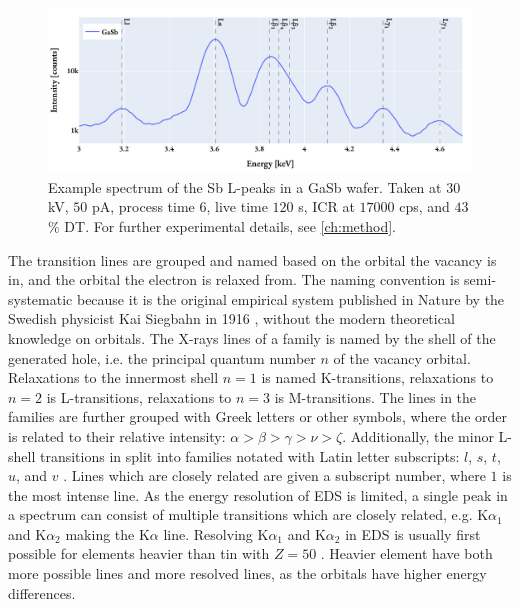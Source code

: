 \begin{figure}[p]
    \centering
    \includegraphics[width=0.99\linewidth]{figures/Sb_L-peaks_30kV_50pA.pdf}
    \caption{
        Example spectrum of the Sb L-peaks in a GaSb wafer.
        Taken at $30$ kV, $50$ pA, process time $6$, live time $120$ s, ICR at $17000$ cps, and $43$\% DT.
        For further experimental details, see \cref{ch:method}.
    }
    \label{fig:theory:xray_formation:Sb_L-peaks}
\end{figure}


The transition lines are grouped and named based on the orbital the vacancy is in, and the orbital the electron is relaxed from.
The naming convention is semi-systematic because it is the original empirical system published in Nature by the Swedish physicist Kai Siegbahn in 1916 \cite{siegbahn_relations_1916}, without the modern theoretical knowledge on orbitals.
The X-rays lines of a family is named by the shell of the generated hole, i.e. the principal quantum number $n$ of the vacancy orbital.
Relaxations to the innermost shell $n=1$ is named K-transitions, relaxations to $n=2$ is L-transitions, relaxations to $n=3$ is M-transitions.
The lines in the families are further grouped with Greek letters or other symbols, where the order is related to their relative intensity: $\alpha > \beta > \gamma > \nu > \zeta$.
Additionally, the minor L-shell transitions in split into families notated with Latin letter subscripts: $l$, $s$, $t$, $u$, and $v$ \cite[Ch. 4.2.4]{goldstein_scanning_2018}.
Lines which are closely related are given a subscript number, where $1$ is the most intense line.
As the energy resolution of EDS is limited, a single peak in a spectrum can consist of multiple transitions which are closely related, e.g. K$\alpha_1$ and K$\alpha_2$ making the K$\alpha$ line.
Resolving K$\alpha_1$ and K$\alpha_2$ in EDS is usually first possible for elements heavier than tin with $ Z = 50$ \cite[Ch. 8.2.2.3]{hollas_modern_2004}. %
Heavier element have both more possible lines and more resolved lines, as the orbitals have higher energy differences.


